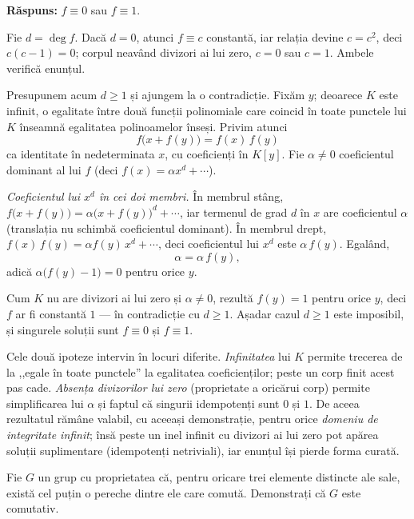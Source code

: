 \noindent\textbf{Răspuns:} $f \equiv 0$ sau $f \equiv 1$.

\begin{solutie}
Fie $d=\deg f$. Dacă $d=0$, atunci $f\equiv c$ constantă, iar
relația devine $c=c^{2}$, deci $c(c-1)=0$; corpul neavând divizori
ai lui zero, $c=0$ sau $c=1$. Ambele verifică enunțul.

Presupunem acum $d\ge 1$ și ajungem la o contradicție. Fixăm
$y$; deoarece $K$ este infinit, o egalitate între două funcții
polinomiale care coincid în toate punctele lui $K$ înseamnă
egalitatea polinoamelor înseși. Privim atunci
\[
  f\bigl(x+f(y)\bigr) = f(x)\,f(y)
\]
ca identitate în nedeterminata $x$, cu coeficienți în $K[y]$.
Fie $\alpha \neq 0$ coeficientul dominant al lui $f$ (deci $f(x)=\alpha x^{d}+\cdots$).

\smallskip
\textit{Coeficientul lui $x^{d}$ în cei doi membri.} În membrul
stâng, $f\bigl(x+f(y)\bigr)=\alpha\bigl(x+f(y)\bigr)^{d}+\cdots$, iar
termenul de grad $d$ în $x$ are coeficientul $\alpha$ (translația nu
schimbă coeficientul dominant). În membrul drept,
$f(x)\,f(y)=\alpha f(y)\,x^{d}+\cdots$, deci coeficientul lui $x^{d}$ este
$\alpha\,f(y)$. Egalând,
\[
  \alpha = \alpha\,f(y),
\]
adică $\alpha\bigl(f(y)-1\bigr)=0$ pentru orice $y$.

\smallskip
Cum $K$ nu are divizori ai lui zero și $\alpha\neq0$, rezultă
$f(y)=1$ pentru orice $y$, deci $f$ ar fi constantă $1$ --- în
contradicție cu $d\ge1$. Așadar cazul $d\ge1$ este imposibil,
și singurele soluții sunt $f\equiv0$ și $f\equiv1$.
\end{solutie}

\begin{obs}
Cele două ipoteze intervin în locuri diferite. \emph{Infinitatea}
lui $K$ permite trecerea de la ,,egale în toate punctele'' la
egalitatea coeficienților; peste un corp finit acest pas cade.
\emph{Absența divizorilor lui zero} (proprietate a oricărui corp)
permite simplificarea lui $\alpha$ și faptul că singurii
idempotenți sunt $0$ și $1$. De aceea rezultatul rămâne
valabil, cu aceeași demonstrație, pentru orice \emph{domeniu de
integritate infinit}; însă peste un inel infinit cu divizori ai
lui zero pot apărea soluții suplimentare (idempotenți
netriviali), iar enunțul își pierde forma curată.
\end{obs}

\begin{problema}
Fie $G$ un grup cu proprietatea că, pentru oricare trei elemente
distincte ale sale, există cel puțin o pereche dintre ele care
comută. Demonstrați că $G$ este comutativ.
\end{problema}

